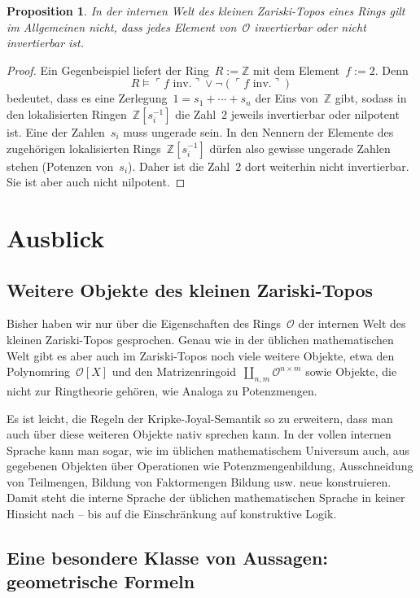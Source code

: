 \documentclass[a4paper,ngerman,12pt]{scrartcl}
\theoremstyle{definition}
\theoremstyle{plain}
\newtheorem{prop}[defn]{Proposition}
\theoremstyle{remark}
\newcommand{\ZZ}{\mathbb{Z}}
\renewcommand{\O}{\mathcal{O}}
\renewcommand{\_}{\mathpunct{.}\,}
\newcommand{\?}{\,{:}\,}
\newcommand{\speak}[1]{\ulcorner\text{#1}\urcorner}
\begin{document}
\begin{prop}In der internen Welt des kleinen Zariski-Topos eines Rings gilt im
Allgemeinen \emph{nicht}, dass jedes Element von~$\O$ invertierbar oder nicht
invertierbar ist.\end{prop}
\begin{proof}Ein Gegenbeispiel liefert der Ring~$R := \ZZ$ mit dem Element~$f
:= 2$. Denn
\[ R \models \speak{$f$ inv.} \vee \neg(\speak{$f$ inv.}) \]
bedeutet, dass es eine Zerlegung~$1 = s_1 + \cdots + s_n$ der Eins
von~$\ZZ$ gibt, sodass in den lokalisierten Ringen~$\ZZ[s_i^{-1}]$ die Zahl~$2$
jeweils invertierbar oder nilpotent ist. Eine der Zahlen~$s_i$ muss ungerade
sein. In den Nennern der Elemente des zugehörigen lokalisierten
Rings~$\ZZ[s_i^{-1}]$ dürfen also gewisse ungerade Zahlen stehen (Potenzen
von~$s_i$). Daher ist die Zahl~$2$ dort weiterhin nicht invertierbar. Sie ist
aber auch nicht nilpotent.
\end{proof}


\section{Ausblick}

\subsection*{Weitere Objekte des kleinen Zariski-Topos}

Bisher haben wir nur über die Eigenschaften des Rings~$\O$ der internen Welt
des kleinen Zariski-Topos gesprochen. Genau wie in der üblichen mathematischen
Welt gibt es aber auch im Zariski-Topos noch viele weitere Objekte, etwa
den Polynomring~$\O[X]$ und den Matrizenringoid~$\amalg_{n,m} \O^{n \times
m}$ sowie Objekte, die nicht zur Ringtheorie gehören, wie
Analoga zu Potenzmengen.

Es ist leicht, die Regeln der Kripke-Joyal-Semantik so zu erweitern, dass man
auch über diese weiteren Objekte nativ sprechen kann. In der vollen internen
Sprache kann man sogar, wie im üblichen mathematischem Universum auch, aus
gegebenen Objekten über Operationen wie Potenzmengenbildung, Ausschneidung von
Teilmengen, Bildung von Faktormengen Bildung usw. neue konstruieren. Damit
steht die interne Sprache der üblichen mathematischen Sprache in keiner
Hinsicht nach -- bis auf die Einschränkung auf konstruktive Logik.


\subsection*{Eine besondere Klasse von Aussagen: geometrische Formeln}
\end{document}
